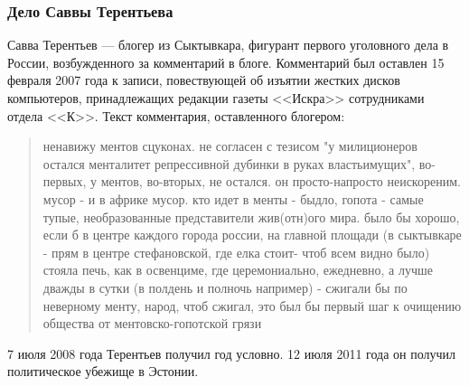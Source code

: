 \subsubsection{Дело Саввы Терентьева}
Савва Терентьев --- блогер из Сыктывкара, фигурант первого уголовного дела в России, возбужденного за комментарий в блоге. Комментарий был оставлен 15 февраля 2007 года к записи, повествующей об изъятии жестких дисков компьютеров, принадлежащих редакции газеты <<Искра>> сотрудниками отдела <<К>>\cite{terentyev_k}.
Текст комментария, оставленного блогером\cite{terentyev_quote}:
\begin{quote}ненавижу ментов сцуконах. не согласен с тезисом "у милиционеров остался менталитет репрессивной дубинки в руках властьимущих", во-первых, у ментов, во-вторых, не остался. он просто-напросто неискореним. мусор - и в африке мусор. кто идет в менты - быдло, гопота - самые тупые, необразованные представители жив(отн)ого мира. было бы хорошо, если б в центре каждого города россии, на главной площади (в сыктывкаре - прям в центре стефановской, где елка стоит- чтоб всем видно было) стояла печь, как в освенциме, где церемониально, ежедневно, а лучше дважды в сутки (в полдень и полночь например) - сжигали бы по неверному менту, народ, чтоб сжигал, это был бы первый шаг к очищению общества от ментовско-гопотской грязи\end{quote}
7 июля 2008 года Терентьев получил год условно\cite{terentyev_year}. 12 июля 2011 года он получил политическое убежище в Эстонии\cite{terentyev_estonia}.
